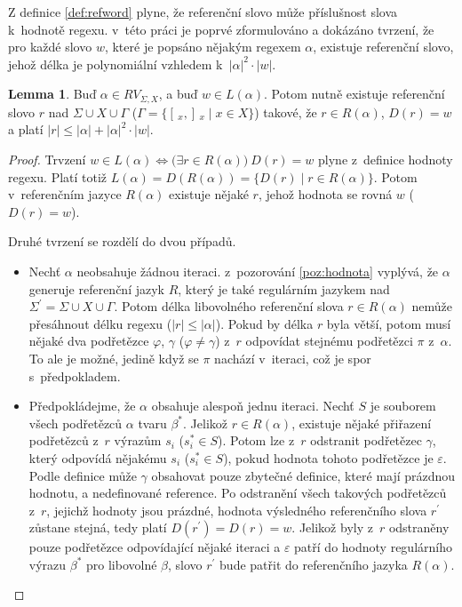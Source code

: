 \documentclass[thesis=B,czech]{FITthesis}[2019/12/23]
\theoremstyle{definition}
\newtheorem{lemma}{Lemma}[chapter]
\begin{document}
Z definice \ref{def:refword} plyne, že referenční slovo může  příslušnost slova k~hodnotě regexu. v~této práci je poprvé zformulováno a dokázáno tvrzení, že pro každé slovo $w$, které je popsáno nějakým regexem $\alpha$, existuje referenční slovo, jehož délka je polynomiální vzhledem k~$|\alpha|^2\cdot|w|$.

\begin{lemma}\label{lem:ref1}
Buď $\alpha \in RV_{\Sigma, X}$, a buď $w \in L(\alpha)$. Potom nutně existuje referenční slovo $r$ nad $\Sigma\cup X \cup\Gamma$ ($\Gamma = \{ [\,_x , ]\,_x \mid x \in X \}$) takové, že $r \in R(\alpha)$, $D(r) = w$ a platí $|r| \le |\alpha|+|\alpha|^2\cdot|w|$.
\end{lemma}

\begin{proof} Trvzení $w \in L(\alpha) \iff \bigg(\exists r \in R(\alpha)\bigg) \ D(r) = w$ plyne z~definice hodnoty regexu. Platí totiž $L(\alpha)=D(R(\alpha))=\{D(r) \mid r \in R(\alpha)\}$. Potom v~referenčním jazyce $R(\alpha)$ existuje nějaké $r$, jehož hodnota se rovná $w$ ($D(r)=w$).  

Druhé tvrzení se rozdělí do dvou případů. 
 \begin{itemize}
	\item{Nechť $\alpha$ neobsahuje žádnou iteraci. z~pozorování \ref{poz:hodnota} vyplývá, že $\alpha$ generuje referenční jazyk $R$, který je také regulárním jazykem nad $\Sigma^\prime = \Sigma \cup X \cup \Gamma$. Potom délka libovolného referenční slova $r \in R(\alpha)$ nemůže přesáhnout délku regexu ($|r| \leq |\alpha|$). Pokud by délka $r$ byla větší, potom musí nějaké dva podřetězce $\varphi$, $\gamma$ ($\varphi \ne \gamma$) z~$r$ odpovídat stejnému podřetězci $\pi$ z~$\alpha$. To ale je možné, jedině když se $\pi$ nachází v~iteraci, což je spor s~předpokladem.}
	\item{Předpokládejme, že $\alpha$ obsahuje alespoň jednu iteraci. Nechť $S$ je souborem všech podřetězců $\alpha$ tvaru $\beta^\ast$. Jelikož $r \in R(\alpha)$, existuje nějaké přiřazení podřetězců z~$r$ výrazům $s_i$ ($s_i^\ast \in S$). Potom lze z~$r$ odstranit podřetězec $\gamma$, který odpovídá nějakému $s_i$ ($s_i^\ast \in S$), pokud hodnota tohoto podřetězce je $\varepsilon$. Podle definice může $\gamma$ obsahovat pouze zbytečné definice, které mají prázdnou hodnotu, a nedefinované reference. Po odstranění všech takových podřetězců z~$r$, jejichž hodnoty jsou prázdné, hodnota výsledného referenčního slova $r^\prime$ zůstane stejná, tedy platí $D(r^\prime)=D(r)=w$. Jelikož byly z~$r$ odstraněny pouze podřetězce odpovídající nějaké iteraci a $\varepsilon$ patří do hodnoty regulárního výrazu $\beta^\ast$ pro libovolné $\beta$, slovo $r^\prime$ bude patřit do referenčního jazyka $R(\alpha)$.  

}
\end{itemize}
\end{proof}
\end{document}
